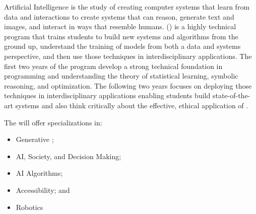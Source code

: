 Artificial Intelligence is the study of creating computer systems that
learn from data and interactions to create systems that can reason,
generate text and images, and interact in ways that resemble humans.
%
\name{} (\short{}) is a highly technical program that trains
students to build new \ai{} systems and algorithms from the ground up, understand the
training of models from both a data and systems perspective, and then
use those techniques in interdisciplinary applications.
%
The first two years of the program develop a strong technical
foundation in programming and understanding the theory of statistical
learning, symbolic reasoning, and optimization.
%
The following two years focuses on deploying those techniques in
interdisciplinary applications enabling students build state-of-the-art \ai{} systems and also think critically
about the effective, ethical application of \ai{}.

The \short{} will offer specializations in:
\begin{itemize}
    \item Generative \ai{};
    \item AI, Society, and Decision Making;
    \item AI Algorithms;
    \item Accessibility; and
    \item Robotics
\end{itemize}